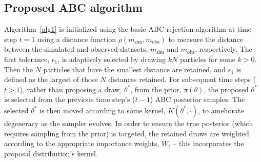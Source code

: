 \documentclass[ejs]{imsart}
\numberwithin{equation}{section}
\theoremstyle{plain}
\newcommand{\msim}{m_{\text{sim}}}
\newcommand{\mobs}{m_{\text{obs}}}
\begin{document}
\subsection{Proposed ABC algorithm}
Algorithm~\eqref{alg1} is initialized using the basic ABC rejection algorithm at time step $t = 1$ using a distance function $\rho(\msim, \mobs)$ to measure the distance between the simulated and observed datasets, $\msim$ and $\mobs$, respectively.  The first tolerance, $\epsilon_1$, is adaptively selected by drawing $kN$ particles for some $k >0$.  Then the $N$ particles that have the smallest distance are retained, and $\epsilon_1$ is defined as the largest of those $N$ distances retained.
%
For subsequent time steps ($t > 1$), rather than proposing a draw, $\theta^*$, from the prior, $\pi(\theta)$, the proposed $\theta^*$ is selected from the previous time step's ($t-1$) ABC posterior samples.  The selected $\theta^*$ is then moved according to some kernel, $K(\theta^*, \cdot)$, to ameliorate degeneracy as the sampler evolves.  In order to ensure the true posterior (which requires sampling from the prior) is targeted, the retained draws are weighted according to the appropriate importance weights, $W_t$ -- this incorporates the proposal distribution's kernel.
\end{document}
